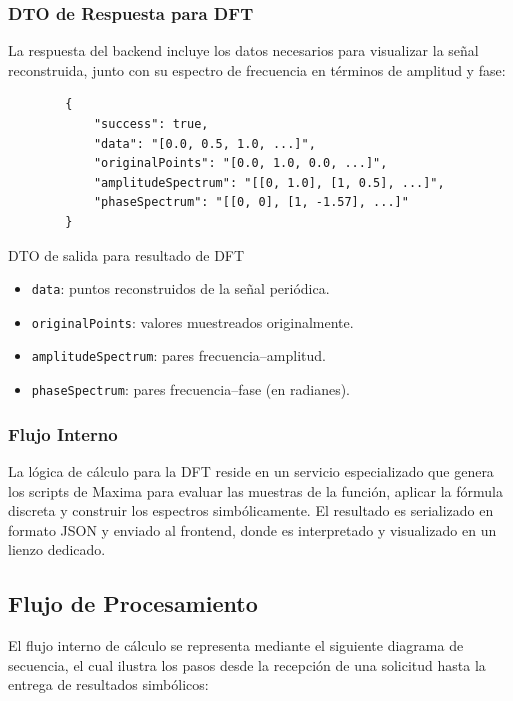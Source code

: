 \subsubsection*{DTO de Respuesta para DFT}

La respuesta del backend incluye los datos necesarios para visualizar la señal reconstruida, junto con su espectro de frecuencia en términos de amplitud y fase:

\begin{listing}[H]
	\begin{verbatim}
		{
			"success": true,
			"data": "[0.0, 0.5, 1.0, ...]",
			"originalPoints": "[0.0, 1.0, 0.0, ...]",
			"amplitudeSpectrum": "[[0, 1.0], [1, 0.5], ...]",
			"phaseSpectrum": "[[0, 0], [1, -1.57], ...]"
		}
	\end{verbatim}
	\caption{DTO de salida para resultado de DFT}
	\label{lst:dft-response}
\end{listing}

\begin{itemize}
	\item \texttt{data}: puntos reconstruidos de la señal periódica.
	\item \texttt{originalPoints}: valores muestreados originalmente.
	\item \texttt{amplitudeSpectrum}: pares frecuencia–amplitud.
	\item \texttt{phaseSpectrum}: pares frecuencia–fase (en radianes).
\end{itemize}

\subsubsection*{Flujo Interno}

La lógica de cálculo para la DFT reside en un servicio especializado que genera los scripts de Maxima para evaluar las muestras de la función, aplicar la fórmula discreta y construir los espectros simbólicamente. El resultado es serializado en formato JSON y enviado al frontend, donde es interpretado y visualizado en un lienzo dedicado.


\subsection{Flujo de Procesamiento}

El flujo interno de cálculo se representa mediante el siguiente diagrama de secuencia, el cual ilustra los pasos desde la recepción de una solicitud hasta la entrega de resultados simbólicos:


